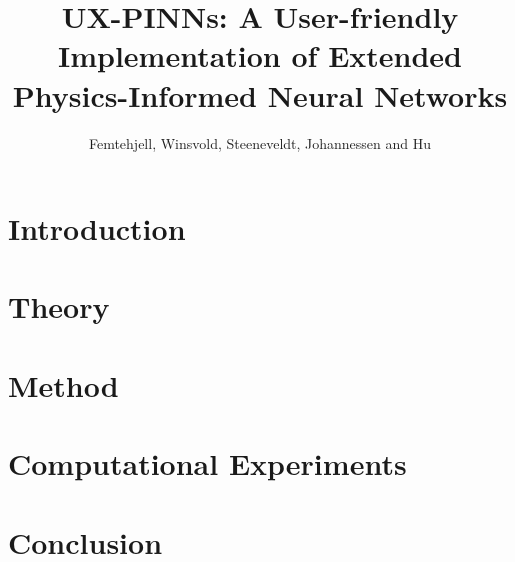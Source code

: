 \documentclass[aps,rmp,reprint,amsmath,amssymb,graphicx,longbibliography]{revtex4-1}
\begin{document}

\title{UX-PINNs: A User-friendly Implementation of Extended Physics-Informed Neural Networks}

\author{Femtehjell, Winsvold, Steeneveldt, Johannessen and Hu}


\begin{abstract}

\end{abstract}

\maketitle

\tableofcontents

\section{Introduction}
\label{sec:introduction}

\section{Theory}
\label{sec:theory}

\section{Method}
\label{sec:method}

\section{Computational Experiments}
\label{sec:compexp}

\section{Conclusion}
\label{sec:conclusion}


\appendix

\end{document}
